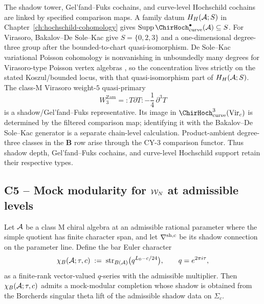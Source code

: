 \begin{remark}
\label{rem:shadow-gf-not-curve-hochschild}
The shadow tower, Gel'fand--Fuks cochains, and curve-level Hochschild
cochains are linked by specified comparison maps.  A family datum
$H_H(\mathcal{A};S)$ in Chapter~\ref{ch:hochschild-cohomology} gives
$\operatorname{Supp}\ChirHoch^\bullet_{\mathrm{curve}}(\cA)
\subseteq S$.  For Virasoro, Bakalov--De Sole--Kac give
$S=\{0,2,3\}$ and a one-dimensional degree-three group after the
bounded-to-chart quasi-isomorphism.  De Sole--Kac variational Poisson
cohomology is nonvanishing in unboundedly many degrees for
Virasoro-type Poisson vertex algebras \cite{BDSK21}, so the
concentration lives strictly on the stated Koszul/bounded locus, with
that quasi-isomorphism part of $H_H(\mathcal{A};S)$.  The class-M Virasoro
weight-$5$
quasi-primary
\[
W_3^{\mathrm{Zam}}={:}T\partial T{:}-\frac14\,\partial^3T
\]
is a shadow/Gel'fand--Fuks representative.  Its image in
$\ChirHoch^3_{\mathrm{curve}}(\Vir_c)$ is determined by the filtered
comparison map; identifying it with the Bakalov--De Sole--Kac
generator is a separate chain-level calculation.  Product-ambient
degree-three classes in the $\mathbf B$ row arise through the CY-$3$
comparison functor.  Thus shadow depth, Gel'fand--Fuks cochains, and
curve-level Hochschild support retain their respective types.
\end{remark}

\subsection{C5 -- Mock modularity for $\mathcal{W}_N$ at admissible levels}
\label{sec:c5-mock-modular}

\begin{conjecture}
\label{conj:c5-mock-modular}
\ClaimStatusConjectured
Let $\mathcal{A}$ be a class M chiral algebra at an admissible rational
parameter where the simple quotient has finite character span, and
let $\nabla^{\rm sh,c}$ be its shadow connection on the parameter
line. Define the bar Euler character
\[
\chi_B(\mathcal{A}; \tau, c) \;:=\; \operatorname{str}_{B(\mathcal{A})}\bigl(q^{L_0 - c/24}\bigr),
\qquad q = e^{2 \pi i \tau},
\]
as a finite-rank vector-valued $q$-series with the admissible
multiplier. Then $\chi_B(\mathcal{A};\tau,c)$ admits a mock-modular
completion whose shadow is obtained from the Borcherds singular theta
lift of the admissible shadow data on $\Sigma_c$.
\end{conjecture}


